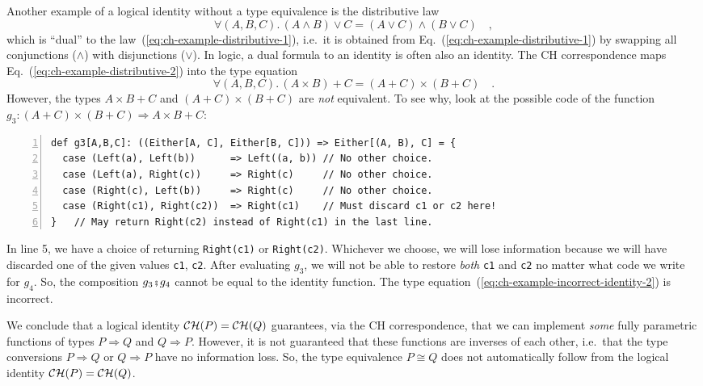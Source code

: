 Another example of a logical identity without a type equivalence is
the distributive law 
\begin{equation}
\forall(A,B,C).\,\left(A\wedge B\right)\vee C=\left(A\vee C\right)\wedge\left(B\vee C\right)\quad,\label{eq:ch-example-distributive-2}
\end{equation}
which is ``dual'' to the law~(\ref{eq:ch-example-distributive-1}),
i.e.~it is obtained from Eq.~(\ref{eq:ch-example-distributive-1})
by swapping all conjunctions ($\wedge$) with disjunctions ($\vee$).
In logic, a dual formula to an identity is often also an identity.
The CH correspondence maps Eq.~(\ref{eq:ch-example-distributive-2})
into the type equation
\begin{equation}
\forall(A,B,C).\,\left(A\times B\right)+C=\left(A+C\right)\times\left(B+C\right)\quad.\label{eq:ch-example-incorrect-identity-2}
\end{equation}
However, the types $A\times B+C$ and $\left(A+C\right)\times\left(B+C\right)$
are \emph{not} equivalent. To see why, look at the possible code of
the function $g_{3}:\left(A+C\right)\times\left(B+C\right)\Rightarrow A\times B+C$:
\begin{lstlisting}[numbers=left,numberstyle={\small}]
def g3[A,B,C]: ((Either[A, C], Either[B, C])) => Either[(A, B), C] = {
  case (Left(a), Left(b))      => Left((a, b)) // No other choice.
  case (Left(a), Right(c))     => Right(c)     // No other choice.
  case (Right(c), Left(b))     => Right(c)     // No other choice.
  case (Right(c1), Right(c2))  => Right(c1)    // Must discard c1 or c2 here!
}   // May return Right(c2) instead of Right(c1) in the last line.
\end{lstlisting}
In line 5, we have a choice of returning \lstinline!Right(c1)! or
\lstinline!Right(c2)!. Whichever we choose, we will lose information
because we will have discarded one of the given values \lstinline!c1!,
\lstinline!c2!. After evaluating $g_{3}$, we will not be able to
restore \emph{both} \lstinline!c1! and \lstinline!c2! \textendash{}
no matter what code we write for $g_{4}$. So, the composition $g_{3}\bef g_{4}$
cannot be equal to the identity function. The type equation~(\ref{eq:ch-example-incorrect-identity-2})
is incorrect.

We conclude that a logical identity ${\cal CH}(P)={\cal CH}(Q)$ guarantees,
via the CH correspondence, that we can implement \emph{some} fully
parametric functions of types $P\Rightarrow Q$ and $Q\Rightarrow P$.
However, it is not guaranteed that these functions are inverses of
each other, i.e.~that the type conversions $P\Rightarrow Q$ or $Q\Rightarrow P$
have no information loss. So, the type equivalence
$P\cong Q$ does not automatically follow from the logical identity
${\cal CH}(P)={\cal CH}(Q)$.

